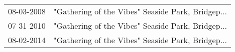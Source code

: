 \begin{supertabular}{ll}
 08-03-2008 &  "Gathering of the Vibes" Seaside Park, Bridgep... \\
 07-31-2010 &  "Gathering of the Vibes" Seaside Park, Bridgep... \\
 08-02-2014 &  "Gathering of the Vibes" Seaside Park, Bridgep... \\
\end{supertabular}
